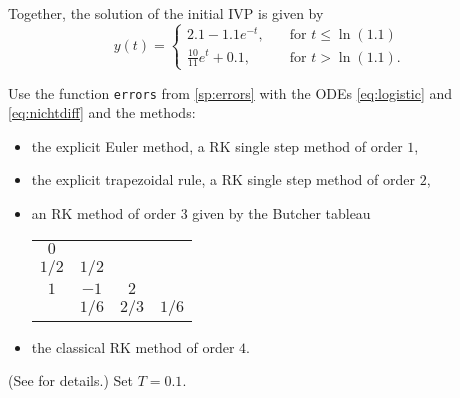 \begin{problem}
\begin{subproblem}[3]
\begin{solution}
Together, the solution of the initial IVP is given by
\begin{equation*}
	y(t) =
	\begin{cases}
	  2.1 - 1.1 e^{-t},&\quad \text{for $t \leq \ln(1.1)$}\\
	  \tfrac{10}{11} e^t + 0.1,&\quad \text{for $t > \ln(1.1)$.}
	\end{cases}
\end{equation*}
\end{solution}
\end{subproblem}



\begin{subproblem}[2] \label{sp:numerical}
Use the function \texttt{errors} from \ref{sp:errors} with the ODEs \eqref{eq:logistic}  and \eqref{eq:nichtdiff} and the methods:
\begin{itemize}\setlength\itemsep{0pt}
	\item the explicit Euler method, a RK single step method of order $1$,
	\item the explicit trapezoidal rule, a RK single step method of order $2$,
	\item an RK method of order $3$ given by the Butcher tableau
	\begin{center}
	\begin{tabular}[c]{c|ccc}
		$0$   &       &       &       \\
		$1/2$ & $1/2$ &       &       \\
		$1$   & $-1$  & $2$   &       \\\hline
		& $1/6$ & $2/3$ & $1/6$ \\
	\end{tabular}
	\end{center}
	\item the classical RK method of order $4$.
\end{itemize}
(See  for details.) Set $T=0.1$.


\end{subproblem}
\end{problem}
